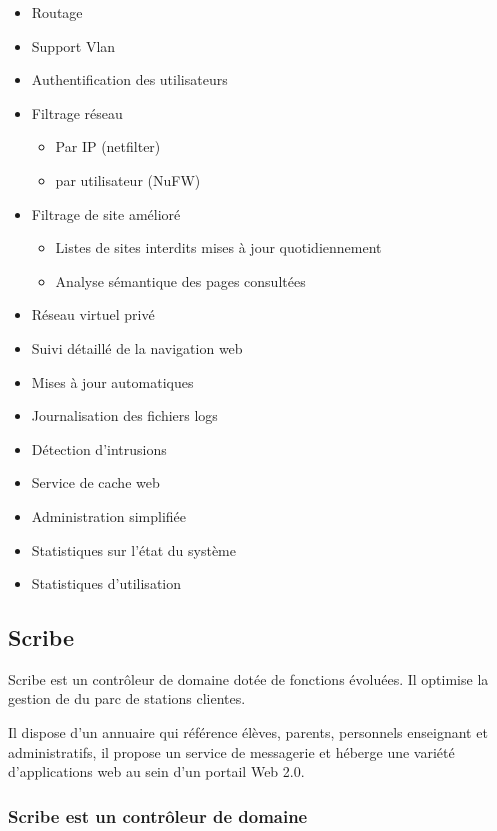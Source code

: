 \begin{itemize}
  \item Routage
  \item Support Vlan
  \item Authentification des utilisateurs
  \item Filtrage réseau
    \begin{itemize}
      \item Par IP (netfilter)
      \item par utilisateur (NuFW)
    \end{itemize}
  \item Filtrage de site amélioré
    \begin{itemize}
      \item Listes de sites interdits mises à jour quotidiennement
      \item Analyse sémantique des pages consultées
    \end{itemize}
  \item Réseau virtuel privé
  \item Suivi détaillé de la navigation web
  \item Mises à jour automatiques
  \item Journalisation des fichiers logs
  \item Détection d'intrusions
  \item Service de cache web
  \item Administration simplifiée
  \item Statistiques sur l'état du système
  \item Statistiques d'utilisation
\end{itemize}   

\subsection{Scribe}

Scribe est un contrôleur de domaine dotée de fonctions évoluées. 
Il optimise la gestion de du parc de stations clientes.

Il dispose d'un annuaire qui référence élèves, parents, personnels 
enseignant et administratifs, il propose un service de messagerie et héberge 
une variété d'applications web au sein d'un portail Web 2.0.

\subsubsection{Scribe est un contrôleur de domaine}

